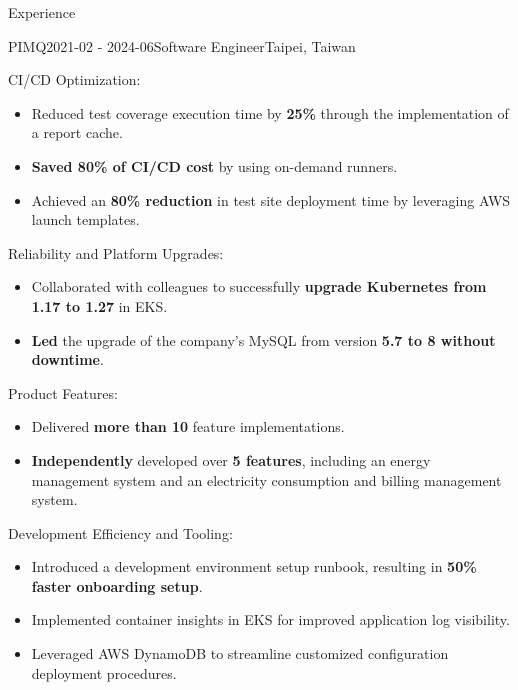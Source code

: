 \documentclass[
	11pt, %
]{resume} %
\newenvironment{myitemize}
  {\begin{itemize}
    \setlength{\itemsep}{-0.5em} \vspace{-0.5em}
  } %
  {\end{itemize}}
\begin{document}
\begin{rSection}{Experience}
	\begin{rSubsection}{PIMQ}{2021-02 - 2024-06}{Software Engineer}{Taipei, Taiwan}
    \item CI/CD Optimization:
    \begin{myitemize}
      \item Reduced test coverage execution time by \textbf{25\%} through the implementation of a report cache.
      \item \textbf{Saved 80\% of CI/CD cost} by using on-demand runners.
      \item Achieved an \textbf{80\% reduction} in test site deployment time by leveraging AWS launch templates.
    \end{myitemize}
    \item Reliability and Platform Upgrades:
    \begin{myitemize}
      \item Collaborated with colleagues to successfully \textbf{upgrade Kubernetes from 1.17 to 1.27} in EKS.
      \item \textbf{Led} the upgrade of the company’s MySQL from version \textbf{5.7 to 8 without downtime}.
    \end{myitemize}
    \item Product Features:
    \begin{myitemize}
      \item Delivered \textbf{more than 10} feature implementations.
      \item \textbf{Independently} developed over \textbf{5 features}, including an energy management system and an electricity consumption and billing management system.
    \end{myitemize}
    \item Development Efficiency and Tooling:
    \begin{myitemize}
      \item Introduced a development environment setup runbook, resulting in \textbf{50\% faster onboarding setup}.
      \item Implemented container insights in EKS for improved application log visibility.
      \item Leveraged AWS DynamoDB to streamline customized configuration deployment procedures.
    \end{myitemize}
  \end{rSubsection}

\end{rSection}

\end{document}

